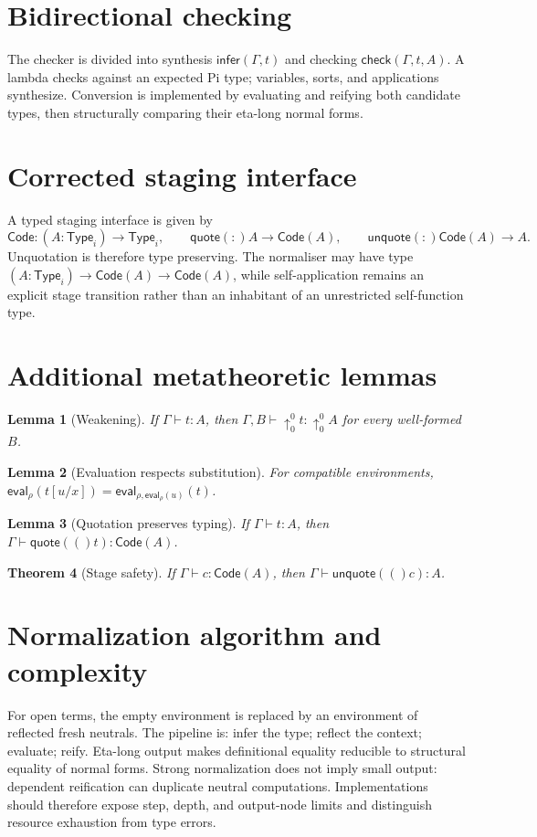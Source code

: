 \documentclass[11pt,a4paper]{article}
\newtheorem{theorem}{Theorem}[section]
\newtheorem{lemma}[theorem]{Lemma}
\newcommand{\Ty}{\mathsf{Type}}
\newcommand{\Code}{\mathsf{Code}}
\renewcommand{\quote}[1]{\mathsf{quote}(#1)}
\newcommand{\unquote}[1]{\mathsf{unquote}(#1)}
\begin{document}
\section{Bidirectional checking}
The checker is divided into synthesis $\mathsf{infer}(\Gamma,t)$ and checking $\mathsf{check}(\Gamma,t,A)$. A lambda checks against an expected Pi type; variables, sorts, and applications synthesize. Conversion is implemented by evaluating and reifying both candidate types, then structurally comparing their eta-long normal forms.

\section{Corrected staging interface}
A typed staging interface is given by
\[
\Code:(A:\Ty_i)\to\Ty_i,\qquad \quote:A\to\Code(A),\qquad \unquote:\Code(A)\to A.
\]
Unquotation is therefore type preserving. The normaliser may have type $(A:\Ty_i)\to\Code(A)\to\Code(A)$, while self-application remains an explicit stage transition rather than an inhabitant of an unrestricted self-function type.

\section{Additional metatheoretic lemmas}
\begin{lemma}[Weakening]
If $\Gamma\vdash t:A$, then $\Gamma,B\vdash\uparrow^0_0t:\uparrow^0_0A$ for every well-formed $B$.
\end{lemma}
\begin{lemma}[Evaluation respects substitution]
For compatible environments, $\mathsf{eval}_\rho(t[u/x])=\mathsf{eval}_{\rho,\mathsf{eval}_\rho(u)}(t)$.
\end{lemma}
\begin{lemma}[Quotation preserves typing]
If $\Gamma\vdash t:A$, then $\Gamma\vdash\quote(t):\Code(A)$.
\end{lemma}
\begin{theorem}[Stage safety]
If $\Gamma\vdash c:\Code(A)$, then $\Gamma\vdash\unquote(c):A$.
\end{theorem}

\section{Normalization algorithm and complexity}
For open terms, the empty environment is replaced by an environment of reflected fresh neutrals. The pipeline is: infer the type; reflect the context; evaluate; reify. Eta-long output makes definitional equality reducible to structural equality of normal forms. Strong normalization does not imply small output: dependent reification can duplicate neutral computations. Implementations should therefore expose step, depth, and output-node limits and distinguish resource exhaustion from type errors.
\end{document}
